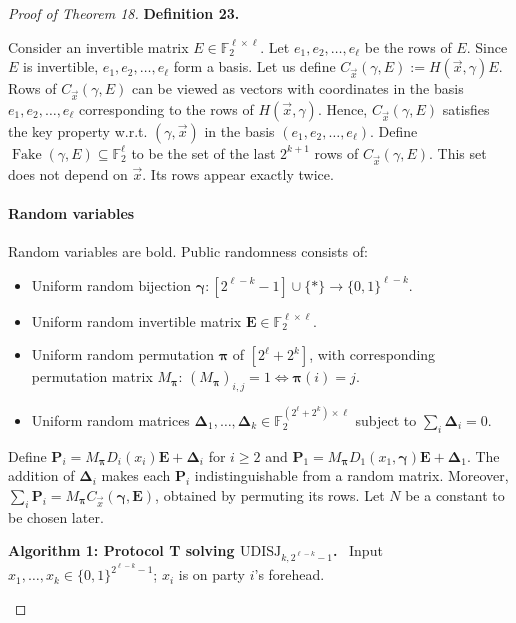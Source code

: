 \documentclass[10pt,a4paper]{article}
\newenvironment{authorclaim}[1]{\par\medskip\noindent\textbf{#1.}\ \ignorespaces}{\par\medskip}
\begin{document}
\begin{proof}[Proof of Theorem 18]
\begin{authorclaim}{Definition 23}
\begin{itemize}
\end{itemize}
\end{authorclaim}
Consider an invertible matrix $E\in\mathbb F_2^{\ell\times\ell}$. Let $e_1,e_2,\ldots,e_\ell$ be the rows of $E$. Since $E$ is invertible, $e_1,e_2,\ldots,e_\ell$ form a basis. Let us define $C_{\vec x}(\gamma,E):=H(\vec x,\gamma)E$. Rows of $C_{\vec x}(\gamma,E)$ can be viewed as vectors with coordinates in the basis $e_1,e_2,\ldots,e_\ell$ corresponding to the rows of $H(\vec x,\gamma)$. Hence, $C_{\vec x}(\gamma,E)$ satisfies the key property w.r.t. $(\gamma,\vec x)$ in the basis $(e_1,e_2,\ldots,e_\ell)$.
Define $\operatorname{Fake}(\gamma,E)\subseteq\mathbb F_2^\ell$ to be the set of the last $2^{k+1}$ rows of $C_{\vec x}(\gamma,E)$. This set does not depend on $\vec x$. Its rows appear exactly twice.
\paragraph{Random variables}
Random variables are bold. Public randomness consists of:
\begin{itemize}
\item Uniform random bijection $\boldsymbol\gamma:[2^{\ell-k}-1]\cup\{*\}\to\{0,1\}^{\ell-k}$.
\item Uniform random invertible matrix $\mathbf E\in\mathbb F_2^{\ell\times\ell}$.
\item Uniform random permutation $\boldsymbol\pi$ of $[2^\ell+2^k]$, with corresponding permutation matrix $M_{\boldsymbol\pi}$: $(M_{\boldsymbol\pi})_{i,j}=1\Longleftrightarrow\boldsymbol\pi(i)=j$.
\item Uniform random matrices $\boldsymbol\Delta_1,\ldots,\boldsymbol\Delta_k\in\mathbb F_2^{(2^\ell+2^k)\times\ell}$ subject to $\sum_i\boldsymbol\Delta_i=0$.
\end{itemize}
Define $\mathbf P_i=M_{\boldsymbol\pi}D_i(x_i)\mathbf E+\boldsymbol\Delta_i$ for $i\ge2$ and $\mathbf P_1=M_{\boldsymbol\pi}D_1(x_1,\boldsymbol\gamma)\mathbf E+\boldsymbol\Delta_1$. The addition of $\boldsymbol\Delta_i$ makes each $\mathbf P_i$ indistinguishable from a random matrix. Moreover, $\sum_i\mathbf P_i=M_{\boldsymbol\pi}C_{\vec x}(\boldsymbol\gamma,\mathbf E)$, obtained by permuting its rows. Let $N$ be a constant to be chosen later.
\begin{authorclaim}{Algorithm 1: Protocol T solving $\mathrm{UDISJ}_{k,2^{\ell-k}-1}$}
Input $x_1,\ldots,x_k\in\{0,1\}^{2^{\ell-k}-1}$; $x_i$ is on party $i$'s forehead.
\begin{algorithmic}

\end{algorithmic}
\end{authorclaim}
\end{proof}
\end{document}
